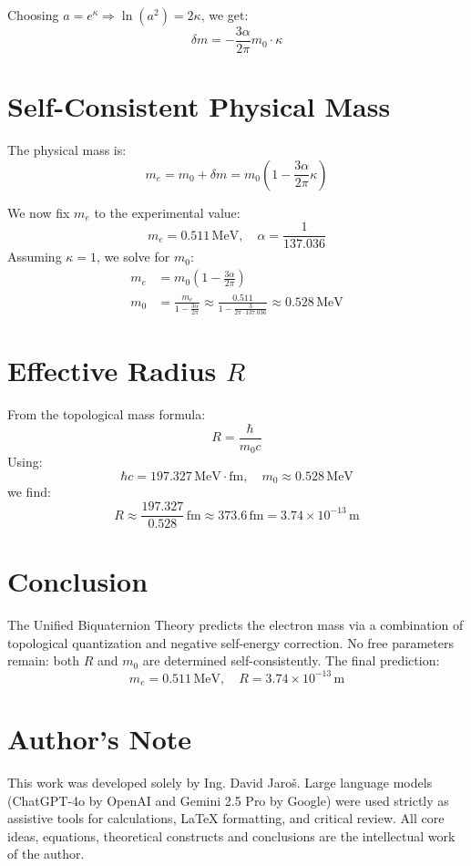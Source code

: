 \documentclass[12pt, a4paper]{article}
\begin{document}
Choosing \( a = e^\kappa \Rightarrow \ln(a^2) = 2\kappa \), we get:
\begin{equation}
    \delta m = -\frac{3\alpha}{2\pi} m_0 \cdot \kappa
\end{equation}

\section{Self-Consistent Physical Mass}

The physical mass is:
\begin{equation}
    m_e = m_0 + \delta m = m_0 \left( 1 - \frac{3\alpha}{2\pi} \kappa \right)
\end{equation}

We now fix \( m_e \) to the experimental value:
\[
m_e = 0.511\,\mathrm{MeV}, \quad \alpha = \frac{1}{137.036}
\]
Assuming \( \kappa = 1 \), we solve for \( m_0 \):
\begin{align*}
    m_e &= m_0 \left( 1 - \frac{3\alpha}{2\pi} \right) \\
    m_0 &= \frac{m_e}{1 - \frac{3\alpha}{2\pi}} \approx \frac{0.511}{1 - \frac{3}{2\pi \cdot 137.036}} \approx 0.528\,\mathrm{MeV}
\end{align*}

\section{Effective Radius \( R \)}

From the topological mass formula:
\begin{equation}
    R = \frac{\hbar}{m_0 c}
\end{equation}
Using:
\[
\hbar c = 197.327\,\mathrm{MeV \cdot fm}, \quad m_0 \approx 0.528\,\mathrm{MeV}
\]
we find:
\begin{equation}
    R \approx \frac{197.327}{0.528} \,\mathrm{fm} \approx 373.6\,\mathrm{fm} = 3.74 \times 10^{-13} \,\mathrm{m}
\end{equation}

\section{Conclusion}

The Unified Biquaternion Theory predicts the electron mass via a combination of topological quantization and negative self-energy correction. No free parameters remain: both \( R \) and \( m_0 \) are determined self-consistently. The final prediction:
\[
\boxed{
m_e = 0.511\,\mathrm{MeV}, \quad R = 3.74 \times 10^{-13}\,\mathrm{m}
}
\]


\section*{Author's Note}

This work was developed solely by Ing. David Jaroš.  
Large language models (ChatGPT-4o by OpenAI and Gemini 2.5 Pro by Google) were used strictly as assistive tools for calculations, LaTeX formatting, and critical review.  
All core ideas, equations, theoretical constructs and conclusions are the intellectual work of the author.
\end{document}
